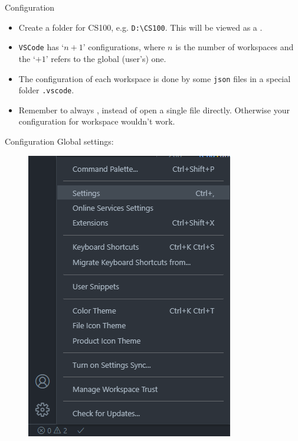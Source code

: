 \documentclass[handout]{beamer}
\begin{document}
\begin{frame}{Configuration}
    \begin{itemize}
        \item Create a folder for CS100, e.g. \texttt{D:\textbackslash CS100}. This will be viewed as a .
        \pause
        \item \texttt{VSCode} has `\(n+1\)' configurations, where \(n\) is the number of workspaces and the `\(+1\)' refers to the global (user's) one.
        \item The configuration of each workspace is done by some \texttt{json} files in a special folder \texttt{.vscode}.
        \pause
        \item Remember to always , instead of open a single file directly. Otherwise your configuration for workspace wouldn't work.
    \end{itemize}
\end{frame}

\begin{frame}{Configuration}
    Global settings:
    \begin{figure}[h]
        \centering
        \includegraphics[height=0.75\textheight]{figures/vsc_global.png}
    \end{figure}
\end{frame}
\end{document}
